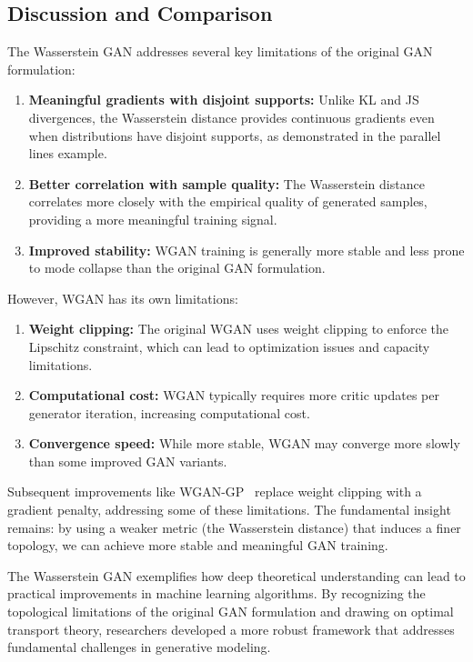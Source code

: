 \subsection{Discussion and Comparison}

The Wasserstein GAN addresses several key limitations of the original GAN formulation:

\begin{enumerate}
  \item \textbf{Meaningful gradients with disjoint supports:} Unlike KL and JS divergences, the Wasserstein distance provides continuous gradients even when distributions have disjoint supports, as demonstrated in the parallel lines example.
  
  \item \textbf{Better correlation with sample quality:} The Wasserstein distance correlates more closely with the empirical quality of generated samples, providing a more meaningful training signal.
  
  \item \textbf{Improved stability:} WGAN training is generally more stable and less prone to mode collapse than the original GAN formulation.
\end{enumerate}

However, WGAN has its own limitations:

\begin{enumerate}
  \item \textbf{Weight clipping:} The original WGAN uses weight clipping to enforce the Lipschitz constraint, which can lead to optimization issues and capacity limitations.
  
  \item \textbf{Computational cost:} WGAN typically requires more critic updates per generator iteration, increasing computational cost.
  
  \item \textbf{Convergence speed:} While more stable, WGAN may converge more slowly than some improved GAN variants.
\end{enumerate}

Subsequent improvements like WGAN-GP~\cite{ref:gulrajani-2017} replace weight clipping with a gradient penalty, addressing some of these limitations. The fundamental insight remains: by using a weaker metric (the Wasserstein distance) that induces a finer topology, we can achieve more stable and meaningful GAN training.

The Wasserstein GAN exemplifies how deep theoretical understanding can lead to practical improvements in machine learning algorithms. By recognizing the topological limitations of the original GAN formulation and drawing on optimal transport theory, researchers developed a more robust framework that addresses fundamental challenges in generative modeling.

